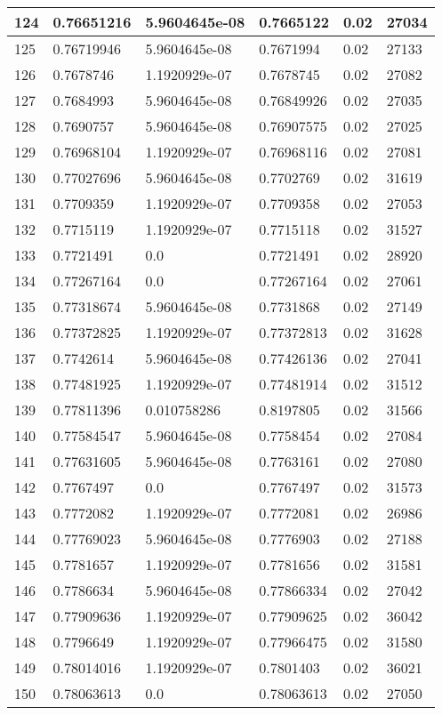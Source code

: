 \begin{longtable}{|l|l|l|l|l|l|}
124 & 0.76651216 & 5.9604645e-08 & 0.7665122 & 0.02 & 27034 \\ \hline 
125 & 0.76719946 & 5.9604645e-08 & 0.7671994 & 0.02 & 27133 \\ \hline 
126 & 0.7678746 & 1.1920929e-07 & 0.7678745 & 0.02 & 27082 \\ \hline 
127 & 0.7684993 & 5.9604645e-08 & 0.76849926 & 0.02 & 27035 \\ \hline 
128 & 0.7690757 & 5.9604645e-08 & 0.76907575 & 0.02 & 27025 \\ \hline 
129 & 0.76968104 & 1.1920929e-07 & 0.76968116 & 0.02 & 27081 \\ \hline 
130 & 0.77027696 & 5.9604645e-08 & 0.7702769 & 0.02 & 31619 \\ \hline 
131 & 0.7709359 & 1.1920929e-07 & 0.7709358 & 0.02 & 27053 \\ \hline 
132 & 0.7715119 & 1.1920929e-07 & 0.7715118 & 0.02 & 31527 \\ \hline 
133 & 0.7721491 & 0.0 & 0.7721491 & 0.02 & 28920 \\ \hline 
134 & 0.77267164 & 0.0 & 0.77267164 & 0.02 & 27061 \\ \hline 
135 & 0.77318674 & 5.9604645e-08 & 0.7731868 & 0.02 & 27149 \\ \hline 
136 & 0.77372825 & 1.1920929e-07 & 0.77372813 & 0.02 & 31628 \\ \hline 
137 & 0.7742614 & 5.9604645e-08 & 0.77426136 & 0.02 & 27041 \\ \hline 
138 & 0.77481925 & 1.1920929e-07 & 0.77481914 & 0.02 & 31512 \\ \hline 
139 & 0.77811396 & 0.010758286 & 0.8197805 & 0.02 & 31566 \\ \hline 
140 & 0.77584547 & 5.9604645e-08 & 0.7758454 & 0.02 & 27084 \\ \hline 
141 & 0.77631605 & 5.9604645e-08 & 0.7763161 & 0.02 & 27080 \\ \hline 
142 & 0.7767497 & 0.0 & 0.7767497 & 0.02 & 31573 \\ \hline 
143 & 0.7772082 & 1.1920929e-07 & 0.7772081 & 0.02 & 26986 \\ \hline 
144 & 0.77769023 & 5.9604645e-08 & 0.7776903 & 0.02 & 27188 \\ \hline 
145 & 0.7781657 & 1.1920929e-07 & 0.7781656 & 0.02 & 31581 \\ \hline 
146 & 0.7786634 & 5.9604645e-08 & 0.77866334 & 0.02 & 27042 \\ \hline 
147 & 0.77909636 & 1.1920929e-07 & 0.77909625 & 0.02 & 36042 \\ \hline 
148 & 0.7796649 & 1.1920929e-07 & 0.77966475 & 0.02 & 31580 \\ \hline 
149 & 0.78014016 & 1.1920929e-07 & 0.7801403 & 0.02 & 36021 \\ \hline 
150 & 0.78063613 & 0.0 & 0.78063613 & 0.02 & 27050 \\ \hline 
\end{longtable}